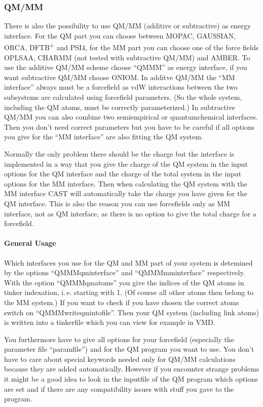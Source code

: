 \documentclass[10pt,a4paper]{article} %
\begin{document}
\subsubsection{QM/MM}

There is also the possibility to use QM/MM (additive or subtractive) as energy interface. For the QM part you can choose between MOPAC, GAUSSIAN, ORCA, DFTB\textsuperscript{+} and PSI4, for the MM part you can choose one of the force fields OPLSAA, CHARMM (not tested with subtractive QM/MM) and AMBER. To use the additive QM/MM scheme choose ``QMMM'' as energy interface, if you want subtractive QM/MM choose ONIOM. In additve QM/MM the ``MM interface'' always must be a forcefield as vdW interactions between the two subsystems are calculated using forcefield parameters. (So the whole system, including the QM atoms, must be correctly parameterized.) In subtractive QM/MM you can also combine two semiempirical or quantumchemical interfaces. Then you don't need correct parameters but you have to be careful if all options you give for the ``MM interface'' are also fitting the QM system. 

Normally the only problem there should be the charge but the interface is implemented in a way that you give the charge of the QM system in the input options for the QM interface and the charge of the total system in the input options for the MM interface. Then when calculating the QM system with the MM interface CAST will automatically take the charge you have given for the QM interface. This is also the reason you can use forcefields only as MM interface, not as QM interface, as there is no option to give the total charge for a forcefield.

\paragraph{General Usage\\}

Which interfaces you use for the QM and MM part of your system is detemined by the options ``QMMMqminterface'' and ``QMMMmminterface'' respectively. With the option ``QMMMqmatoms'' you give the indices of the QM atoms in tinker indexation, i.\,e. starting with 1. (Of course all other atoms then belong to the MM system.) If you want to check if you have chosen the correct atoms switch on ``QMMMwriteqmintofile''. Then your QM system (including link atoms) is written into a tinkerfile which you can view for example in VMD.

You furthermore have to give all options for your forcefield (especially the parameter file ``paramfile'') and for the QM program you want to use. You don't have to care about special keywords needed only for QM/MM calculations because they are added automatically. However if you encounter strange problems it might be a good idea to look in the inputfile of the QM program which options are set and if there are any compatibility issues with stuff you gave to the program.
\end{document}
